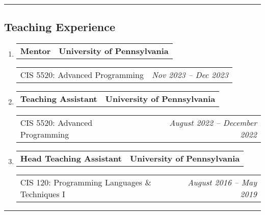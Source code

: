 \documentclass[letterpaper]{article}
\makeatletter
\newif\iflong
\newcommand*{\tabulardef}[3]{\begin{tabular}[t]{@{}lp{\dimexpr\linewidth-#1}@{}}
    #2&#3
\end{tabular}}
\newcommand{\headerrow}[2]
{\begin{tabular*}{\linewidth}{l@{\extracolsep{\fill}}r}
	#1 &
	#2 \\
\end{tabular*}}
\makeatother
\begin{document}
\hrule
\subsection*{Teaching Experience}
\begin{enumerate}[label=]
	\parskip=-0.05em
    \item
        \headerrow
            {\textbf{Mentor}}
            {\textbf{University of Pennsylvania}}
        \headerrow
            {CIS 5520: Advanced Programming}
            {\emph{Nov 2023 -- Dec 2023}}
        \iflong
        \begin{enumerate}[label= *]
            \parskip=-0.1em
        \item\tabulardef{5cm}{}{Advise student groups on a final project of their choosing in Haskell showcasing the material covered over the course of the semester}
        \end{enumerate}
        \fi

	\item
		\headerrow
			{\textbf{Teaching Assistant}}
			{\textbf{University of Pennsylvania}}
	\headerrow
		{CIS 5520: Advanced Programming}
		{\emph{August 2022 -- December 2022}}
    \iflong
	\begin{enumerate}[label= *]
		\parskip=-0.1em
        \item\tabulardef{5cm}{}{Assist with in-class discussion and cooperative exercises centered around functional programming patterns in the Haskell programming language}        
        \item\tabulardef{5cm}{}{Advise student groups on a final project of their choosing in Haskell showcasing the material covered over the course of the semester}
	\end{enumerate}
    \fi

	\item
		\headerrow
			{\textbf{Head Teaching Assistant}}
			{\textbf{University of Pennsylvania}}
	\headerrow
		{CIS 120: Programming Languages \& Techniques I}
		{\emph{August 2016 -- May 2019}}
    \iflong
	\begin{enumerate}[label= *]
		\parskip=-0.1em
        \item\tabulardef{5cm}{}{Co-lead and prepare a weekly recitation to review course material on core programming languages and techniques, taught in OCaml and then Java}
		\item Hire and train new teaching assistants
	\end{enumerate}
    \fi
\end{enumerate}
\hrule
\end{document}
